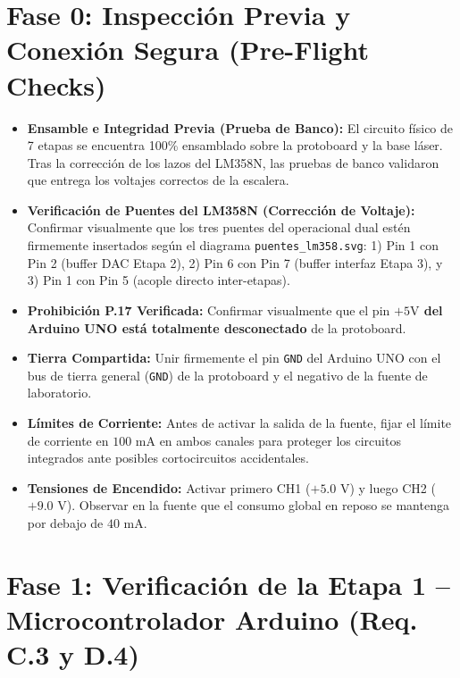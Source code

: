 \documentclass[10pt,a4paper]{article}
\newcommand{\squarebox}{\raisebox{-0.1ex}{\Large $\square$}}
\begin{document}
\section{Fase 0: Inspección Previa y Conexión Segura (Pre-Flight Checks)}

\begin{itemize}[label=\squarebox]
    \item \textbf{Ensamble e Integridad Previa (Prueba de Banco):} El circuito físico de 7 etapas se encuentra 100\% ensamblado sobre la protoboard y la base láser. Tras la corrección de los lazos del LM358N, las pruebas de banco validaron que entrega los voltajes correctos de la escalera.
    \item \textbf{Verificación de Puentes del LM358N (Corrección de Voltaje):} Confirmar visualmente que los tres puentes del operacional dual estén firmemente insertados según el diagrama \texttt{puentes\_lm358.svg}: 1) Pin 1 con Pin 2 (buffer DAC Etapa 2), 2) Pin 6 con Pin 7 (buffer interfaz Etapa 3), y 3) Pin 1 con Pin 5 (acople directo inter-etapas).
    \item \textbf{Prohibición P.17 Verificada:} Confirmar visualmente que el pin \textbf{$+5\text{V}$ del Arduino UNO está totalmente desconectado} de la protoboard.
    \item \textbf{Tierra Compartida:} Unir firmemente el pin \texttt{GND} del Arduino UNO con el bus de tierra general (\texttt{GND}) de la protoboard y el negativo de la fuente de laboratorio.
    \item \textbf{Límites de Corriente:} Antes de activar la salida de la fuente, fijar el límite de corriente en $100\text{ mA}$ en ambos canales para proteger los circuitos integrados ante posibles cortocircuitos accidentales.
    \item \textbf{Tensiones de Encendido:} Activar primero CH1 ($+5.0\text{ V}$) y luego CH2 ($+9.0\text{ V}$). Observar en la fuente que el consumo global en reposo se mantenga por debajo de $40\text{ mA}$.
\end{itemize}

\section{Fase 1: Verificación de la Etapa 1 -- Microcontrolador Arduino (Req. C.3 y D.4)}
\end{document}
